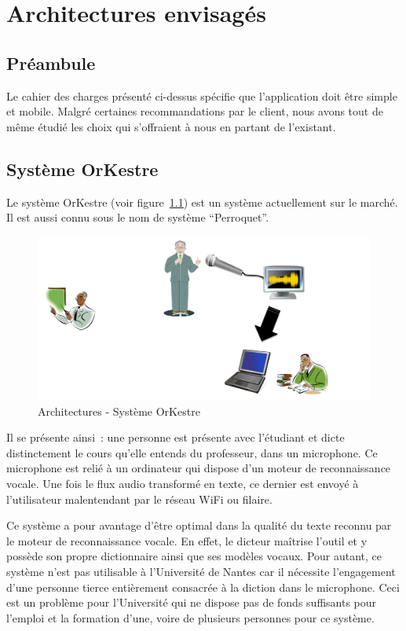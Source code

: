 \chapter{Architectures envisagés}
\minitoc

\section{Préambule}
Le cahier des charges présenté ci-dessus spécifie que l'application doit être
simple et mobile. Malgré certaines recommandations par le client, nous avons
tout de même étudié les choix qui s'offraient à nous en partant de l'existant.

\section{Système OrKestre}

Le système OrKestre (voir figure~\ref{fig:orkestre}) est un système actuellement sur le marché. Il est aussi
connu sous le nom de système ``Perroquet''.


\begin{figure}[h]
 \centering
 \includegraphics[scale=0.5]{./img/orKestre.png}
 \caption{Architectures - Système OrKestre}
 \label{fig:orkestre}
\end{figure}

Il se présente ainsi~: une personne est présente avec l'étudiant et dicte distinctement le cours qu'elle entends du professeur, dans un microphone. Ce microphone est relié à un ordinateur qui dispose d'un moteur de reconnaissance vocale. Une fois le flux audio transformé en texte, ce dernier est envoyé à l'utilisateur malentendant par le réseau WiFi ou filaire.

Ce système a pour avantage d'être optimal dans la qualité du texte reconnu par le moteur de reconnaissance vocale. En effet, le dicteur maîtrise l'outil et y possède son propre dictionnaire ainsi que ses modèles vocaux. 
Pour autant, ce système n'est pas utilisable à l'Université de Nantes car il nécessite l'engagement d'une personne tierce entièrement consacrée à la diction dans le microphone. Ceci est un problème pour l'Université qui ne dispose pas de fonds suffisants pour l'emploi et la formation d'une, voire de plusieurs personnes pour ce système.

